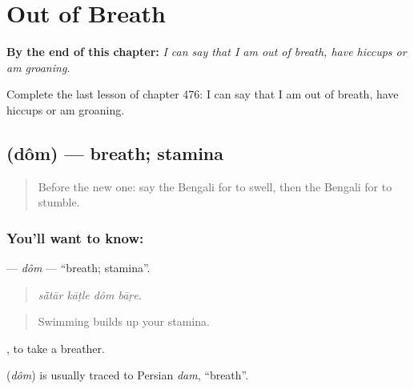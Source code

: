 
\chapter{Out of Breath}
\label{ch:bn-out-of-breath}

\begin{chapteropening}
\textbf{By the end of this chapter:} \emph{I can say that I am out of breath, have hiccups or am groaning.}

Complete the last lesson of chapter 476: I can say that I am out of breath, have hiccups or am groaning.
\end{chapteropening}

\section[\texorpdfstring{\bn{দম} (dôm)}{দম (dôm)}]{ (dôm) — breath; stamina}

\label{lesson:BN-C476-dom}



\begin{quote}
Before the new one: say the Bengali for to swell, then the Bengali for to stumble.
\end{quote}

\subsection*{You'll want to know: }
\textbf{} — \emph{dôm} — \textquotedblleft{}breath; stamina\textquotedblright{}.

\begin{quote}
   
\end{quote}

\begin{quote}
\emph{sā̃tār kāṭle dôm bāṛe.}
\end{quote}

\begin{quote}
Swimming builds up your stamina.
\end{quote}

 , to take a breather.

\begin{cousinweb}
\textbf{} (\emph{dôm}) is usually traced to Persian \emph{dam}, \textquotedblleft{}breath\textquotedblright{}.
\end{cousinweb}


